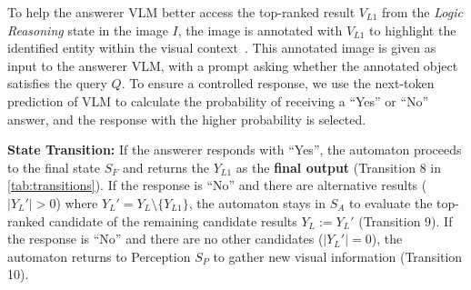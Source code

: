 To help the answerer VLM better access the top-ranked result $V_{L1}$ from the \emph{Logic Reasoning} state in the image $I$, the image is annotated with $V_{L1}$ to highlight the identified entity within the visual context~\cite{yang_set--mark_2023}. This annotated image is given as input to the answerer VLM, with a prompt asking whether the annotated object satisfies the query $Q$. To ensure a controlled response, we use the next-token prediction of VLM to calculate the probability of receiving a ``Yes'' or ``No'' answer, and the response with the higher probability is selected.


\textbf{State Transition:} If the answerer responds with ``Yes”, the automaton proceeds to the final state $S_F$ and returns the $Y_{L1}$ as the \textbf{final output} (Transition 8 in \autoref{tab:transitions}). If the response is ``No” and there are alternative results ($|Y_L'| > 0$) where $Y_L' = Y_L \setminus \{Y_{L1}\}$, the automaton stays in $S_A$ to evaluate the top-ranked candidate of the remaining candidate results $Y_L := Y_L'$ (Transition 9). If the response is “No” and there are no other candidates ($|Y_L'| = 0$), the automaton returns to Perception $S_P$ to gather new visual information (Transition 10). %
